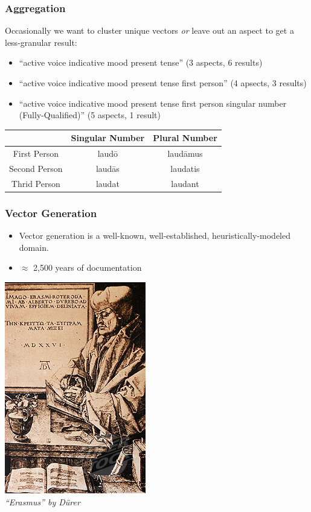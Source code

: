 \documentclass[slidestop,compress,mathserif]{beamer}
\begin{document}
\begin{frame}
	\frametitle{Aggregation}
	Occasionally we want to cluster unique vectors \emph{or} leave out an aspect to get a less-granular result:
	\pause
	\begin{itemize}
		\item ``active voice indicative mood present tense'' (3 aspects, 6 results)
		\pause
		\item ``active voice indicative mood present tense first person'' (4 apsects, 3 results)
		\pause
		\item ``active voice indicative mood present tense first person singular number (Fully-Qualified)'' (5 aspects, 1 result)
	\end{itemize}
	\begin{center}
		\begin{tabular}{|c|c|c|}
			\hline
			  & Singular Number &  Plural Number\\
			\hline
			First Person  & laud\={o}  & laud\={a}mus\\
			Second Person & laud\={a}s & laudatis \\
			Thrid Person  & laudat     & laudant \\
			\hline
		\end{tabular}
	\end{center}
\end{frame}

\begin{frame}
	\frametitle{Vector Generation}
	\begin{itemize}
		\item Vector generation is a well-known, well-established, heuristically-modeled domain.
		\pause
		\item $\approx$ 2,500 years of documentation
	\end{itemize}
	\begin{center}
		\includegraphics[scale=0.5]{img/erasmus.jpg} \\
		\pause
		\emph{``Erasmus'' by D\"{u}rer}
	\end{center}
\end{frame}
\end{document}

